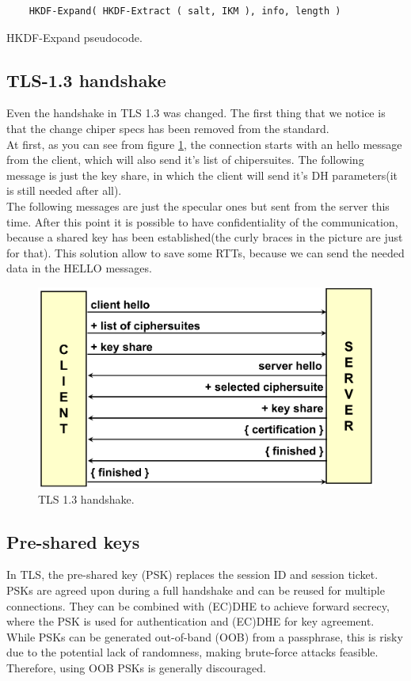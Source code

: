 
\begin{listing}[H]
  \begin{verbatim}
    HKDF-Expand( HKDF-Extract ( salt, IKM ), info, length )
  \end{verbatim}
  \caption{HKDF-Expand pseudocode.}
  \label{lst:hkdf-expand}
\end{listing}

\subsection{TLS-1.3 handshake}
Even the handshake in TLS 1.3 was changed. The first thing that we
notice is that the change chiper specs has been removed from the
standard.\\
At first, as you can see from figure \ref{fig:tls-1.3-handshake}, the
connection starts with an hello message from the client, which will
also send it's list of chipersuites. The following message is just the
key share, in which the client will send it's DH parameters(it is
still needed after all).\\ 
The following messages are just the specular ones but sent from the
server this time. After this point it is possible to have
confidentiality of the communication, because a shared key has been
established(the curly braces in the picture are just for that). This
solution allow to save some RTTs, because we can send the needed data
in the HELLO messages.

\begin{figure}[H]
  \centering
  \includegraphics[width=.6\textwidth]{img/TLS 1-3 handshake.png}
  \caption{TLS 1.3 handshake.}
  \label{fig:tls-1.3-handshake}
\end{figure}

\subsection{Pre-shared keys}
In TLS, the pre-shared key (PSK) replaces the session ID and session
ticket. PSKs are agreed upon during a full handshake and can be reused
for multiple connections. They can be combined with (EC)DHE to achieve
forward secrecy, where the PSK is used for authentication and (EC)DHE
for key agreement. While PSKs can be generated out-of-band (OOB) from
a passphrase, this is risky due to the potential lack of randomness,
making brute-force attacks feasible. Therefore, using OOB PSKs is
generally discouraged.

